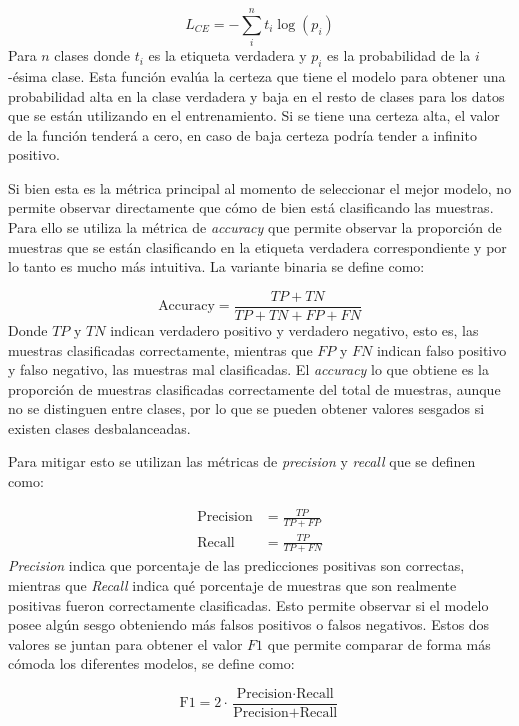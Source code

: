\begin{equation}
    L_{CE} = -\sum_i^n t_i \log(p_i)
\end{equation}
Para $n$ clases donde $t_i$ es la etiqueta verdadera y $p_i$ es la probabilidad de la $i$-ésima clase. Esta función evalúa la certeza que tiene el modelo para obtener una probabilidad alta en la clase verdadera y baja en el resto de clases para los datos que se están utilizando en el entrenamiento. Si se tiene una certeza alta, el valor de la función tenderá a cero, en caso de baja certeza podría tender a infinito positivo.

Si bien esta es la métrica principal al momento de seleccionar el mejor modelo, no permite observar directamente que cómo de bien está clasificando las muestras. Para ello se utiliza la métrica de \textit{accuracy} que permite observar la proporción de muestras que se están clasificando en la etiqueta verdadera correspondiente y por lo tanto es mucho más intuitiva. La variante binaria se define como:

\begin{equation}
    \text{Accuracy} = \frac{TP+TN}{TP+TN+FP+FN}
\end{equation}
Donde $TP$ y $TN$ indican verdadero positivo y verdadero negativo, esto es, las muestras clasificadas correctamente, mientras que $FP$ y $FN$ indican falso positivo y falso negativo, las muestras mal clasificadas. El \textit{accuracy} lo que obtiene es la proporción de muestras clasificadas correctamente del total de muestras, aunque no se distinguen entre clases, por lo que se pueden obtener valores sesgados si existen clases desbalanceadas.

Para mitigar esto se utilizan las métricas de \textit{precision} y \textit{recall} que se definen como:

\begin{align}
    \text{Precision} &= \frac{TP}{TP + FP} \\
    \text{Recall} &= \frac{TP}{TP + FN}
\end{align}
\textit{Precision} indica que porcentaje de las predicciones positivas son correctas, mientras que \textit{Recall} indica qué porcentaje de muestras que son realmente positivas fueron correctamente clasificadas. Esto permite observar si el modelo posee algún sesgo obteniendo más falsos positivos o falsos negativos. Estos dos valores se juntan para obtener el valor $F1$ que permite comparar de forma más cómoda los diferentes modelos, se define como:

\begin{equation}
    \text{F1} = 2 \cdot \frac{\text{Precision} \cdot \text{Recall}}{\text{Precision} + \text{Recall}}
\end{equation}

